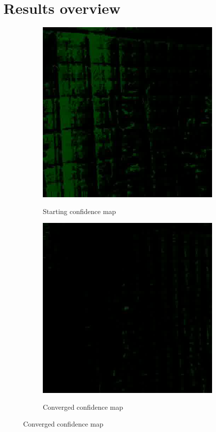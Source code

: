 \section{Results overview}
\begin{figure}[t]
    \centering
\begin{subfigure}[b]{.45\linewidth}
       \includegraphics[width=0.9\linewidth]{conf1}
\label{startconf}
        \caption{Starting confidence map}
      \end{subfigure}%
\hspace{.01\linewidth}
\begin{subfigure}[b]{.45\linewidth}
	 \includegraphics[width=0.9\linewidth]{conf2}
       \label{endconf}
      \caption{Converged confidence map}
  

\end{subfigure}
\end{figure}

